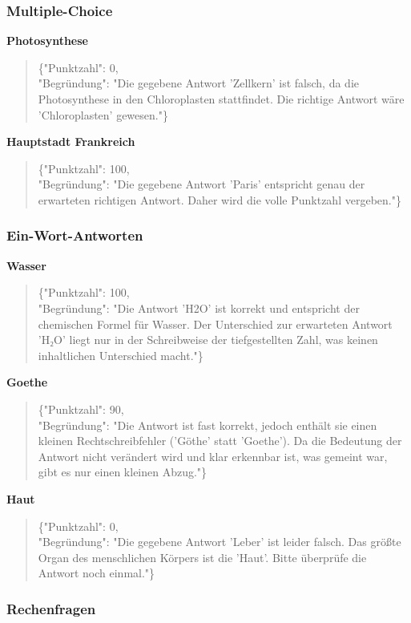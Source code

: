 \documentclass[a4paper,12pt]{article}
\begin{document}
\subsubsection{Multiple-Choice}

\textbf{Photosynthese}
\begin{quote}
\{"Punktzahl": 0,\\
"Begründung": "Die gegebene Antwort 'Zellkern' ist falsch, da die Photosynthese in den Chloroplasten stattfindet. Die richtige Antwort wäre 'Chloroplasten' gewesen."\}
\end{quote}

\textbf{Hauptstadt Frankreich}
\begin{quote}
\{"Punktzahl": 100,\\
"Begründung": "Die gegebene Antwort 'Paris' entspricht genau der erwarteten richtigen Antwort. Daher wird die volle Punktzahl vergeben."\}
\end{quote}

\subsubsection{Ein-Wort-Antworten}

\textbf{Wasser}
\begin{quote}
\{"Punktzahl": 100,\\
"Begründung": "Die Antwort 'H2O' ist korrekt und entspricht der chemischen Formel für Wasser. Der Unterschied zur erwarteten Antwort 'H₂O' liegt nur in der Schreibweise der tiefgestellten Zahl, was keinen inhaltlichen Unterschied macht."\}
\end{quote}

\textbf{Goethe}
\begin{quote}
\{"Punktzahl": 90,\\
"Begründung": "Die Antwort ist fast korrekt, jedoch enthält sie einen kleinen Rechtschreibfehler ('Göthe' statt 'Goethe'). Da die Bedeutung der Antwort nicht verändert wird und klar erkennbar ist, was gemeint war, gibt es nur einen kleinen Abzug."\}
\end{quote}

\textbf{Haut}
\begin{quote}
\{"Punktzahl": 0,\\
"Begründung": "Die gegebene Antwort 'Leber' ist leider falsch. Das größte Organ des menschlichen Körpers ist die 'Haut'. Bitte überprüfe die Antwort noch einmal."\}
\end{quote}

\subsubsection{Rechenfragen}
\end{document}
